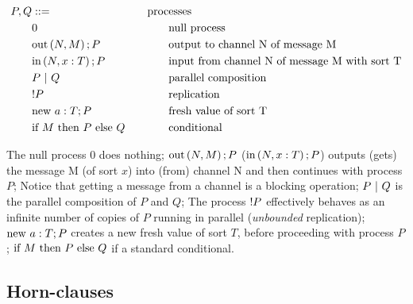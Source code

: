 \begin{equation}
\label{eq:apic-processes}
\begin{aligned}
    P, Q &::= \\
    &0 \\
    &\mbox{out}\left(N, M\right); P \\
    &\mbox{in}\left(N, x: T\right); P \\
    &P\ |\ Q\\
    &!P\\
    &\mbox{new}\ a: T; P\\
    &\mbox{if}\ M\ \mbox{then}\ P\ \mbox{else}\ Q
\end{aligned}
\qquad
\begin{aligned}
    \mbox{proc}&\mbox{esses} \\
    &\mbox{null process}\\
    &\mbox{output to channel N of message M}\\
    &\mbox{input from channel N of message M with sort T}\\
    &\mbox{parallel composition}\\
    &\mbox{replication}\\
    &\mbox{fresh value of sort T}\\
    &\mbox{conditional}
\end{aligned}
\end{equation}

The null process $0$ does nothing;
$\mbox{out}\left(N, M\right); P$ ($\mbox{in}\left(N, x: T\right); P$) outputs (gets) the message M (of sort $x$) into (from) channel N and then continues with process $P$; Notice that getting a message from a channel is a blocking operation;
$P\ |\ Q$ is the parallel composition of $P$ and $Q$;
The process $!P$ effectively behaves as an infinite number of copies of $P$ running in parallel (\textit{unbounded} replication);
$\mbox{new}\ a: T; P$ creates a new fresh value of sort $T$, before proceeding with process $P$;
$\mbox{if}\ M\ \mbox{then}\ P\ \mbox{else}\ Q$ if a standard conditional.




\subsection{Horn-clauses}







